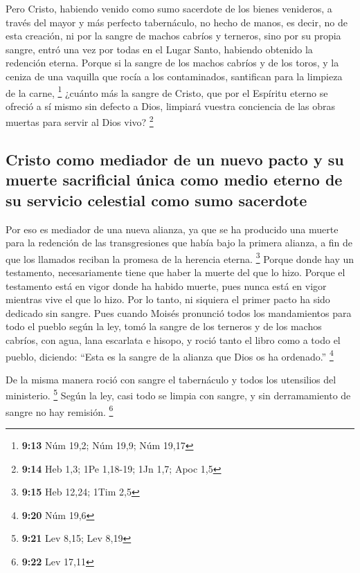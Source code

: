  Pero Cristo, habiendo venido como sumo sacerdote de los
bienes venideros, a través del mayor y más perfecto tabernáculo, no
hecho de manos, es decir, no de esta creación,  ni por la
sangre de machos cabríos y terneros, sino por su propia sangre, entró
una vez por todas en el Lugar Santo, habiendo obtenido la redención
eterna.  Porque si la sangre de los machos cabríos y de
los toros, y la ceniza de una vaquilla que rocía a los contaminados,
santifican para la limpieza de la carne, \footnote{\textbf{9:13} Núm
  19,2; Núm 19,9; Núm 19,17}  ¿cuánto más la sangre de
Cristo, que por el Espíritu eterno se ofreció a sí mismo sin defecto a
Dios, limpiará vuestra conciencia de las obras muertas para servir al
Dios vivo? \footnote{\textbf{9:14} Heb 1,3; 1Pe 1,18-19; 1Jn 1,7; Apoc
  1,5}

\hypertarget{cristo-como-mediador-de-un-nuevo-pacto-y-su-muerte-sacrificial-uxfanica-como-medio-eterno-de-su-servicio-celestial-como-sumo-sacerdote}{%
\subsection{Cristo como mediador de un nuevo pacto y su muerte
sacrificial única como medio eterno de su servicio celestial como sumo
sacerdote}\label{cristo-como-mediador-de-un-nuevo-pacto-y-su-muerte-sacrificial-uxfanica-como-medio-eterno-de-su-servicio-celestial-como-sumo-sacerdote}}

 Por eso es mediador de una nueva alianza, ya que se ha
producido una muerte para la redención de las transgresiones que había
bajo la primera alianza, a fin de que los llamados reciban la promesa de
la herencia eterna. \footnote{\textbf{9:15} Heb 12,24; 1Tim 2,5}
 Porque donde hay un testamento, necesariamente tiene que
haber la muerte del que lo hizo.  Porque el testamento
está en vigor donde ha habido muerte, pues nunca está en vigor mientras
vive el que lo hizo.  Por lo tanto, ni siquiera el primer
pacto ha sido dedicado sin sangre.  Pues cuando Moisés
pronunció todos los mandamientos para todo el pueblo según la ley, tomó
la sangre de los terneros y de los machos cabríos, con agua, lana
escarlata e hisopo, y roció tanto el libro como a todo el pueblo,
 diciendo: ``Esta es la sangre de la alianza que Dios os
ha ordenado.'' \footnote{\textbf{9:20} Núm 19,6}

 De la misma manera roció con sangre el tabernáculo y
todos los utensilios del ministerio. \footnote{\textbf{9:21} Lev 8,15;
  Lev 8,19}  Según la ley, casi todo se limpia con
sangre, y sin derramamiento de sangre no hay remisión. \footnote{\textbf{9:22}
  Lev 17,11}

